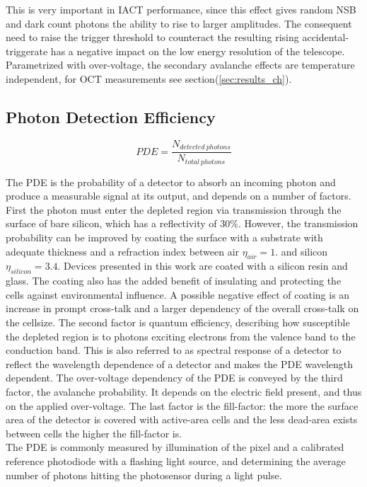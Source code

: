 \documentclass[12pt,article,type=msc,colorback,accentcolor=tud9c]{tudthesis}
\begin{document}
This is very important in IACT performance, since this effect gives random NSB and dark count photons the ability to rise to larger amplitudes. The consequent need to raise the trigger threshold to counteract the resulting rising accidental-triggerate has a negative impact on the low energy resolution of the telescope.\\

Parametrized with over-voltage, the secondary avalanche effects are temperature independent, for OCT measurements see section(\ref{sec:results_ch}).




\subsection{Photon Detection Efficiency}
\label{subsec:SiPMPDE}

\begin{equation}
PDE = \frac{N_{detected\:photons}}{N_{total\:photons}}
\end{equation}

The PDE is the probability of a detector to absorb an incoming photon and produce a measurable signal at its output, and depends on a number of factors. First the photon must enter the depleted region via transmission through the surface of bare silicon, which has a reflectivity of 30$\%$. However, the transmission probability can be improved by coating the surface with a substrate with adequate thickness and a refraction index between air $\eta_{air} = 1.$ and silicon $\eta_{silicon} = 3.4$. Devices presented in this work are coated with a silicon resin and glass. The coating also has the added benefit of insulating and protecting the cells against environmental influence. A possible negative effect of coating is an increase in prompt cross-talk and a larger dependency of the overall cross-talk on the cellsize.\cite{Yamamoto} The second factor is quantum efficiency, describing how susceptible the depleted region is to photons exciting electrons from the valence band to the conduction band. This is also referred to as spectral response of a detector to reflect the wavelength dependence of a detector and makes the PDE wavelength dependent. The over-voltage dependency of the PDE is conveyed by the third factor, the avalanche probability. It depends on the electric field present, and thus on the applied over-voltage. The last factor is the fill-factor: the more the surface area of the detector is covered with active-area cells and the less dead-area exists between cells the higher the fill-factor is. \\
The PDE is commonly measured by illumination of the pixel and a calibrated reference photodiode with a flashing light source, and determining the average number of photons hitting the photosensor during a light pulse.
\end{document}
